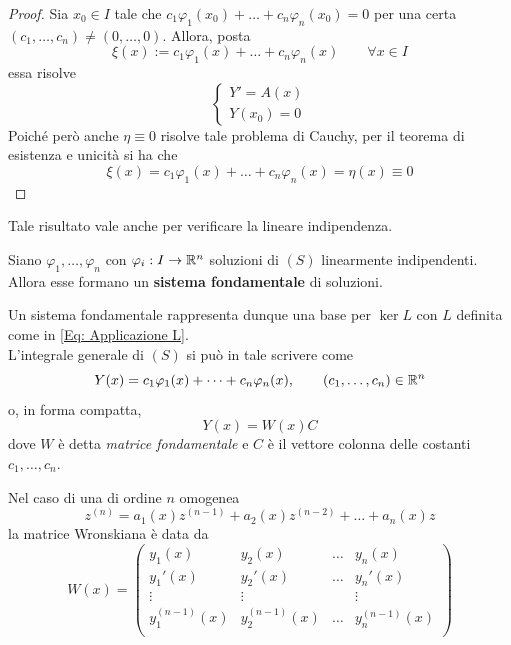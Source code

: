 \begin{proof}
   Sia $x_0 \in I$ tale che $c_1 \varphi_1(x_0)+ \dots+c_n \varphi_n(x_0) = 0$ per una certa $(c_1, \dots, c_n) \neq (0, \dots, 0)$.
   Allora, posta
   \begin{equation}
       \xi(x):=c_1 \varphi_1(x)+ \dots
        +c_n \varphi_n(x) \qquad \forall x \in I
   \end{equation}
   essa risolve 
   \begin{equation}
       \begin{cases}
           Y'=A(x)\\
           Y(x_0)=0
       \end{cases}
   \end{equation}
   Poiché però anche $\eta\equiv 0$ risolve tale problema di Cauchy, per il teorema di esistenza e unicità si ha che 
   \begin{equation}
       \xi(x)=c_1 \varphi_1(x)+ \dots
        +c_n \varphi_n(x) =\eta(x) \equiv0
   \end{equation}
\end{proof}
Tale risultato vale anche per verificare la lineare indipendenza.
\begin{definition}
    Siano $\varphi_1, \dots, \varphi_n$ con $\varphi_i:I \to \mathbb{R}^n$ 
    soluzioni di $(S)$ linearmente indipendenti. Allora esse formano un \textbf{sistema fondamentale} di soluzioni.
\end{definition}
Un sistema fondamentale rappresenta dunque una base per $\ker L$ con $L$ definita come in \eqref{Eq: Applicazione L}.\\
L'integrale generale di $(S)$ si può in tale scrivere come 
\begin{equation}
    Y(x)= c_1\varphi_1(x)+ \dots+ c_n\varphi_n(x), \qquad (c_1, \dots, c_n) \in \mathbb{R}^n
\end{equation}
o, in forma compatta, 
\begin{equation}
    Y(x)=W(x)C
\end{equation}
dove $W$ è detta \textit{matrice fondamentale} e $C$ è il vettore colonna delle costanti $c_1, \dots, c_n$.\\
\begin{oss}
    Nel caso di una \ode di ordine $n$ omogenea
    \begin{equation}
        z^{(n)}=a_1(x)z^{(n-1)}+ a_2(x)z^{(n-2)}+ \dots + a_n(x)z
    \end{equation}
    la matrice Wronskiana è data da
    \begin{equation}
        W(x)=\begin{pmatrix}
            y_1(x) & y_2(x) & \dots & y_n(x)\\
            y_1'(x) & y_2'(x) & \dots & y_n'(x)\\
            \vdots & \vdots & \, & \vdots\\
            y_1^{(n-1)}(x) & y_2^{(n-1)}(x) & \dots & y_n^{(n-1)}(x)\\
        \end{pmatrix}
    \end{equation}
\end{oss}
